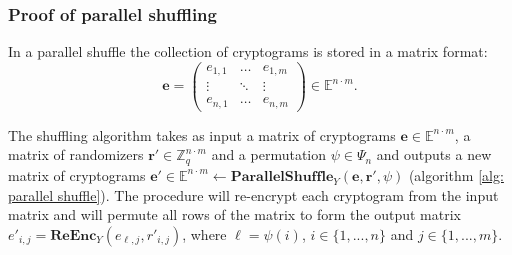 \begin{algorithm}[!h]
\DontPrintSemicolon
    \caption{\( \mathbf{VerifyShuffle}_Y (PK, \boldsymbol{e}, \boldsymbol{e'}) \)}
     
\end{algorithm}



\iffalse
\clearpage
\subsubsection{Proof of parallel shuffling}
In a parallel shuffle the collection of cryptograms is stored in a matrix format: 
\[
\boldsymbol{e} = \begin{pmatrix}
    e_{1, 1} & \dots & e_{1, m} \\
    \vdots & \ddots & \vdots \\
    e_{n, 1} & \dots & e_{n, m}
\end{pmatrix} \in \mathbb{E}^{n \cdot m}.
\]

The shuffling algorithm takes as input a matrix of cryptograms \( \boldsymbol{e} \in \mathbb{E}^{n \cdot m} \), a matrix of randomizers \( \boldsymbol{r'} \in \mathbb{Z}_q^{n \cdot m} \) and a permutation \( \psi \in \Psi_n \) and outputs a new matrix of cryptograms \( \boldsymbol{e'} \in \mathbb{E}^{n \cdot m} \leftarrow \mathbf{ParallelShuffle}_Y (\boldsymbol{e}, \boldsymbol{r'}, \psi) \) (algorithm \ref{alg: parallel shuffle}). The procedure will re-encrypt each cryptogram from the input matrix and will permute all rows of the matrix to form the output matrix \( e'_{i, j} = \mathbf{ReEnc}_Y (e_{\ell, j}, r'_{i, j}) \), where \( \ell = \psi(i) \), \( i \in \{ 1, ..., n \} \) and \( j \in \{ 1, ..., m \} \).


